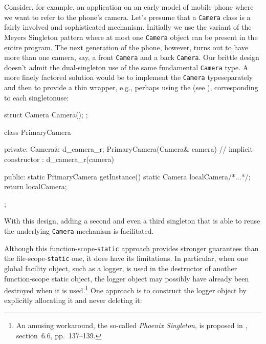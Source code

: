 Consider, for example, an application on an early
model of mobile phone where we want to refer to the phone's camera.
Let's presume that a \lstinline!Camera! class is a fairly involved and
sophisticated mechanism. Initially we use the variant of the Meyers
Singleton pattern where at most one \lstinline!Camera! object can be
present in the entire program. The next generation of the phone, however, turns out to have more than
one camera, say, a front \lstinline!Camera! and a back \lstinline!Camera!. Our
brittle design doesn't
admit the dual-singleton use of the same fundamental \lstinline!Camera!
type. A more finely factored solution would be to implement the
\lstinline!Camera! type\linebreak[4]
 \mbox{separately} and then to provide a thin wrapper,
e.g., perhaps using the  (see ), corresponding to each singleton\linebreak[4]%
 use:


\begin{emcppshiddenlisting}[emcppsbatch=e11]
struct Camera {
  Camera();
};
\end{emcppshiddenlisting}
\begin{emcppslisting}[emcppsbatch=e11]
class PrimaryCamera
{
private:
    Camera& d_camera_r;
    PrimaryCamera(Camera& camera)  // implicit constructor
      : d_camera_r(camera) { }

public:
    static PrimaryCamera getInstance()
    {
        static Camera localCamera{/*...*/};
        return localCamera;
    }
};
\end{emcppslisting}

\noindent With this design, adding a second and even a third singleton that is
able to reuse the underlying \lstinline!Camera! mechanism is facilitated.

Although this function-scope-\lstinline!static! approach provides stronger guarantees than the file-scope-\lstinline!static! one, it does have its limitations. In
particular, when one global facility object, such as a logger, is used
in the destructor of another function-scope static object, the logger
object may possibly have already been destroyed when it is
used.\footnote{An amusing workaround, the so-called \emph{Phoenix
Singleton}, is proposed in \cite{alexandrescu01}, section~6.6, pp.~137--139.} One approach is to construct the logger object by
explicitly allocating it and never deleting it:


